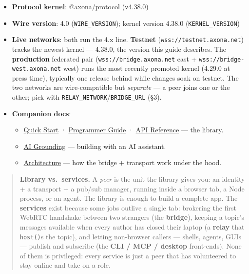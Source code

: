 \documentclass[
  nobib]{tufte-handout}
\providecommand{\tightlist}{%
  \setlength{\itemsep}{0pt}\setlength{\parskip}{0pt}}
\begin{document}
\begin{itemize}
\tightlist
\item
  \textbf{Protocol kernel}:
  \href{https://github.com/axona-net/axona-protocol}{@axona/protocol}
  (v4.38.0)
\item
  \textbf{Wire version}: 4.0 (\texttt{WIRE\_VERSION}); kernel version
  4.38.0 (\texttt{KERNEL\_VERSION})
\item
  \textbf{Live networks}: both run the 4.x line. \textbf{Testnet}
  (\texttt{wss://testnet.axona.net}) tracks the newest kernel ---
  4.38.0, the version this guide describes. The \textbf{production}
  federated pair (\texttt{wss://bridge.axona.net} east +
  \texttt{wss://bridge-west.axona.net} west) runs the most recently
  promoted kernel (4.29.0 at press time), typically one release behind
  while changes soak on testnet. The two networks are wire-compatible
  but \emph{separate} --- a peer joins one or the other; pick with
  \texttt{RELAY\_NETWORK}/\texttt{BRIDGE\_URL} (§3).
\item
  \textbf{Companion docs}:

  \begin{itemize}
  \tightlist
  \item
    \href{Quick-Start-v4.38.0.md}{Quick Start} ·
    \href{Axona-Programmer-Guide-v4.38.0.md}{Programmer Guide} ·
    \href{Axona-API-Reference-v4.38.0.md}{API Reference} --- the
    library.
  \item
    \href{Axona-AI-Grounding-v4.30.0.md}{AI Grounding} --- building with
    an AI assistant.
  \item
    \href{../architecture/Axona-Architecture.tex}{Architecture} --- how
    the bridge + transport work under the hood.
  \end{itemize}
\end{itemize}

\begin{quote}
\textbf{Library vs.~services.} A \emph{peer} is the unit the library
gives you: an identity + a transport + a pub/sub manager, running inside
a browser tab, a Node process, or an agent. The library is enough to
build a complete app. The \textbf{services} exist because some jobs
outlive a single tab: brokering the first WebRTC handshake between two
strangers (the \textbf{bridge}), keeping a topic's messages available
when every author has closed their laptop (a \textbf{relay} that
\texttt{host()}s the topic), and letting non-browser callers --- shells,
agents, GUIs --- publish and subscribe (the \textbf{CLI / MCP / desktop}
front-ends). None of them is privileged: every service is just a peer
that has volunteered to stay online and take on a role.
\end{quote}
\end{document}
